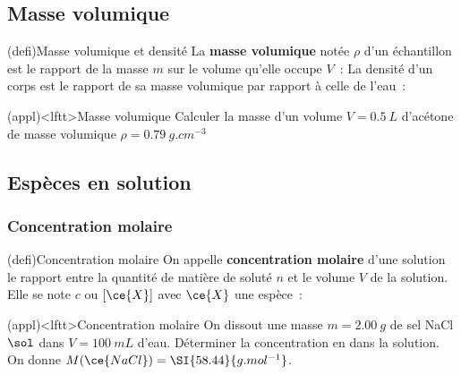 \documentclass[../../main/main.tex]{subfiles}
\begin{document}
\subsection{Masse volumique}
\begin{tcb*}[label=defi:massevol, sidebyside, righthand ratio=.4]
	(defi){Masse volumique et densité}
	La \textbf{masse volumique} notée $\rho$ d'un échantillon est le rapport
	de la masse $m$ sur le volume qu'elle occupe $V$~:
	\psw{%
		\[
			\boxed{\rho = \frac{m}{V}}
			\qen
			\si{kg.m^{-3}}
			\qou
			\si{g.L^{-1}}
			\qou
			\si{g.cm^{-3}}
		\]
	}%
	\tcblower
	La densité d'un corps est le rapport de sa masse volumique par rapport à
	celle de l'eau~:
	\psw{%
		\[
			\boxed{d = \frac{\rho}{\rho_{\eau}}}
			\qav
			\rho_{\eau} = \SI{1.0}{kg.L^{-1}}
		\]
	}%
\end{tcb*}

\begin{tcb}[label=exem:massvol](appl)<lftt>{Masse volumique}
	Calculer la masse d'un volume $V = \SI{0.5}{L}$ d'acétone de masse volumique
	$\rho = \SI{0.79}{g.cm^{-3}}$
	\tcblower
\end{tcb}

\vspace{-15pt}
\subsection{Espèces en solution}
\subsubsection{Concentration molaire}

\begin{tcb*}[label=def:cmol](defi){Concentration molaire}
	On appelle \textbf{concentration molaire} d'une solution le
	rapport entre la quantité de matière de soluté $n$ et le volume $V$ de
	la solution. Elle se note $c$ ou $[\ce{X}]$ avec $\ce{X}$ une espèce~:
	\psw{%
		\[
			\boxed{c = \frac{n}{V}}
			\qen
			\si{mol.L^{-1}}
		\]
	}%
\end{tcb*}
\begin{tcb}[label=exem:cmol, breakable](appl)<lftt>{Concentration molaire}
	On dissout une masse $m = \SI{2.00}{g}$ de sel NaCl$\sol$ dans $V =
		\SI{100}{mL}$ d'eau.
	\smallbreak
	Déterminer la concentration en  dans la solution.
	\smallbreak
	On donne $M(\ce{NaCl}) = \SI{58.44}{g.mol^{-1}}$.
	\tcblower
\end{tcb}
\end{document}
